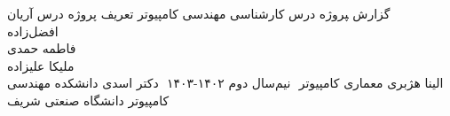‫
‫%
‫%
‫%
‫
‫\newcommand{\ProjectReportType}
‫{ گزارش ‍‍‍‍‍پروژه درس} 
‫\newcommand{\StudentDegree}
‫{کارشناسی}  %
‫\newcommand{\CourseMajor}
‫{مهندسی کامپیوتر}  %
‫\newcommand{\CourseReportTitle}
‫{تعریف پروژه درس}
‫\newcommand{\GroupeMembers}
‫{آریان افضل‌زاده\\فاطمه حمدی\\ملیکا علیزاده\\الینا هژبری}
‫\newcommand{\CourseName}
‫{معماری کامپیوتر}
‫
‫\newcommand{\courseSemester}
‫{نیم‌سال دوم ۱۴۰۲-۱۴۰۳}
‫
‫\newcommand{\CourseProfessor}
‫{دکتر اسدی}
‫\newcommand{\Department}
‫{دانشکده مهندسی کامپیوتر}
‫\newcommand{\University}
‫{دانشگاه صنعتی شریف}
‫
‫%
‫%
‫%
‫
‫